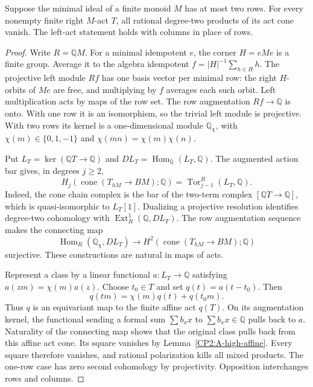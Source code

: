 \begin{lemma}
\label{CP2:A-high-two-row-act}
Suppose the minimal ideal of a finite monoid $M$ has at most
two rows.  For every nonempty finite right $M$-act $T$, all
rational degree-two products of its act cone vanish.  The
left-act statement holds with columns in place of rows.
\end{lemma}
\begin{proof}
Write $R=\mathbb QM$.  For a minimal idempotent $e$, the corner
$H=eMe$ is a finite group.  Average it to the algebra idempotent
$f=|H|^{-1}\sum_{h\in H}h$.  The projective left module $Rf$
has one basis vector per minimal row: the right $H$-orbits of
$Me$ are free, and multiplying by $f$ averages each such orbit.
Left multiplication acts by maps of the row set.  The row
augmentation $Rf\to\mathbb Q$ is onto.  With one row it is an
isomorphism, so the trivial left module is projective.
With two rows its kernel is a one-dimensional module
$\mathbb Q_\chi$, with $\chi(m)\in\{0,1,-1\}$ and
$\chi(mn)=\chi(m)\chi(n)$.

Put $L_T=\ker(\mathbb QT\to\mathbb Q)$ and
$D L_T=\operatorname{Hom}_{\mathbb Q}(L_T,\mathbb Q)$.
The augmented action bar gives, in degrees $j\geq2$,
\[
 H_j(\operatorname{cone}(T_{hM}\to BM);\mathbb Q)
       =\operatorname{Tor}_{j-1}^{R}(L_T,\mathbb Q).
\]
Indeed, the cone chain complex is the bar of the two-term
complex $[\mathbb QT\to\mathbb Q]$, which is
quasi-isomorphic to $L_T[1]$.  Dualizing a projective resolution
identifies degree-two cohomology with
$\operatorname{Ext}^1_R(\mathbb Q,D L_T)$.  The row augmentation
sequence makes the connecting map
\[
 \operatorname{Hom}_R(\mathbb Q_\chi,D L_T)
       \longrightarrow H^2(\operatorname{cone}(T_{hM}\to BM);\mathbb Q)
\]
surjective.  These constructions are natural in maps of acts.

Represent a class by a linear functional $a:L_T\to\mathbb Q$
satisfying $a(zm)=\chi(m)a(z)$.  Choose $t_0\in T$ and set
$q(t)=a(t-t_0)$.  Then
\[
 q(tm)=\chi(m)q(t)+q(t_0m).
\]
Thus $q$ is an equivariant map to the finite affine act $q(T)$.
On its augmentation kernel, the functional sending a formal
sum $\sum b_xx$ to $\sum b_xx\in\mathbb Q$ pulls back to $a$.
Naturality of the connecting map shows that the original class
pulls back from this affine act cone.  Its square vanishes by
Lemma~\ref{CP2:A-high-affine}.  Every square therefore vanishes,
and rational polarization kills all mixed products.  The one-row
case has zero second cohomology by projectivity.  Opposition
interchanges rows and columns.
\end{proof}

